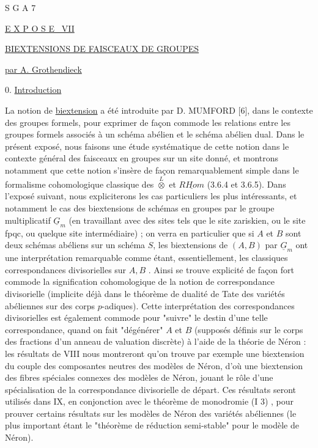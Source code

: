 


S G A 7


\underline{E X P O S E \ VII}


\underline{BIEXTENSIONS DE FAISCEAUX DE GROUPES}


\underline{par A. Grothendieck}


0. \underline{Introduction}

La notion de \underline{biextension} a été introduite par D. MUMFORD [6], dans le contexte des groupes formels, pour exprimer de façon commode les relations entre les groupes formels associés à un schéma abélien et le schéma abélien dual. Dans le présent exposé, nous faisons une étude systématique de cette notion dans le contexte général des faisceaux en groupes sur un site donné, et montrons notamment que cette notion s'insère de façon remarquablement simple dans le formalisme cohomologique classique des $\overset{L}{\otimes}$ et $\underline{RHom}$ (3.6.4 et 3.6.5). Dans l'exposé suivant, nous expliciterons les cas particuliers les plus intéressants, et notamment le cas des biextensions de schémas en groupes par le groupe multiplicatif $\underline{G}_{m}$ (en travaillant avec des sites tels que le site zariskien, ou le site fpqc, ou quelque site intermédiaire) ; on   verra en particulier que si $A$ et $B$ sont deux schémas abéliens sur un schéma $S$, les biextensions de $(A,B)$ par $\underline{G}_{m}$ ont une interprétation remarquable comme étant, essentiellement, les classiques correspondances divisorielles sur $A,B$ . Ainsi se trouve explicité de façon fort commode la signification cohomologique de la notion de correspondance divisorielle (implicite déjà dans le théorème de dualité de Tate des variétés abéliennes sur des corps $p$-adiques). Cette interprétation des correspondances divisorielles est également commode pour "suivre" le destin d'une telle correspondance, quand on fait "dégénérer"
$A$ et $B$ (supposés définis sur le corps des fractions d'un anneau de valuation discrète) à l'aide de la théorie de Néron : les résultats de VIII nous montreront qu'on trouve par exemple une biextension du couple des composantes neutres des modèles de Néron, d'où une biextension des fibres spéciales connexes des modèles de Néron, jouant le rôle d'une spécialisation de la correspondance divisorielle de départ. Ces résultats seront utilisés dans IX, en conjonction avec le théorème de monodromie (I 3) , pour prouver certains résultats sur les modèles de Néron des variétés abéliennes  (le plus important étant le "théorème de réduction semi-stable" pour le modèle de Néron).

